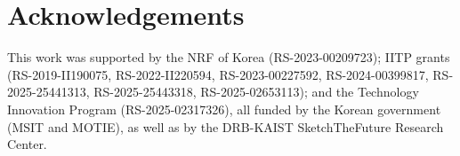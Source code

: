 \section{Acknowledgements}
This work was supported by the NRF of Korea (RS-2023-00209723); IITP grants (RS-2019-II190075, RS-2022-II220594, RS-2023-00227592, RS-2024-00399817, RS-2025-25441313, RS-2025-25443318, RS-2025-02653113); and the Technology Innovation Program (RS-2025-02317326), all funded by the Korean government (MSIT and MOTIE), as well as by the DRB-KAIST SketchTheFuture Research Center.